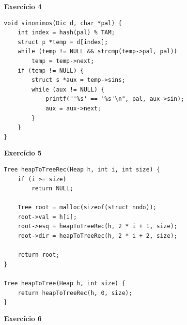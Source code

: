 \documentclass[a4paper,11pt]{article}
\begin{document}
\noindent \textbf{Exercício 4}

\begin{verbatim}
void sinonimos(Dic d, char *pal) {
	int index = hash(pal) % TAM;
	struct p *temp = d[index];
	while (temp != NULL && strcmp(temp->pal, pal))
		temp = temp->next;
	if (temp != NULL) {
		struct s *aux = temp->sins;
		while (aux != NULL) {
			printf("'%s' == '%s'\n", pal, aux->sin);
			aux = aux->next;
		}
	}
}
\end{verbatim}

\newpage

\noindent \textbf{Exercício 5}

\begin{verbatim}
Tree heapToTreeRec(Heap h, int i, int size) {
	if (i >= size)
		return NULL;
	
	Tree root = malloc(sizeof(struct nodo));
	root->val = h[i];
	root->esq = heapToTreeRec(h, 2 * i + 1, size);
	root->dir = heapToTreeRec(h, 2 * i + 2, size);
	
	return root;
}
	
Tree heapToTree(Heap h, int size) {
	return heapToTreeRec(h, 0, size);
}
\end{verbatim}

\noindent \textbf{Exercício 6}
\end{document}
